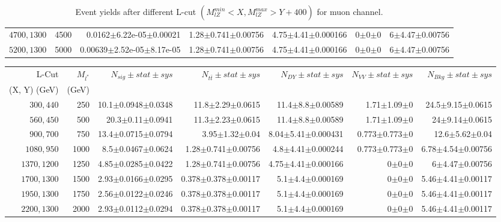 \documentclass[]{article}
\begin{document}
\begin{table}
\begin{center}
{\begin{tabular}{ |r|r|r|r|r|r|r|}
$4700,1300$ & 4500 & 0.0162$\pm$6.22e-05$\pm$0.00021 & 1.28$\pm$0.741$\pm$0.00756 & 4.75$\pm$4.41$\pm$0.000166 & 0$\pm$0$\pm$0 & 6$\pm$4.47$\pm$0.00756 \\
$5200,1300$ & 5000 & 0.00639$\pm$2.52e-05$\pm$8.17e-05 & 1.28$\pm$0.741$\pm$0.00756 & 4.75$\pm$4.41$\pm$0.000166 & 0$\pm$0$\pm$0 & 6$\pm$4.47$\pm$0.00756 \\
\hline 
\end{tabular}
}
\end{center}
\caption{Event yields after different L-cut $(M_{lZ}^{min} < X, M_{lZ}^{max} > Y + 400)$ for muon channel.}
\end{table}
\begin{table}
\begin{center}
\scriptsize{
\begin{tabular}{ |r|r|r|r|r|r|r|}
\hline 
L-Cut & $M_{l^*}$ & $N_{sig}\pm stat \pm sys $ &$N_{t\bar{t}}\pm stat \pm sys $ & $N_{DY}\pm stat \pm sys $ & $N_{VV}\pm stat \pm sys $ &$N_{Bkg}\pm stat \pm sys$\\
 (X, Y) (GeV) & (GeV) & && &&\\
\hline 
$300, 440$ & 250 & 10.1$\pm$0.0948$\pm$0.0348 & 11.8$\pm$2.29$\pm$0.0615 & 11.4$\pm$8.8$\pm$0.00589 & 1.71$\pm$1.09$\pm$0 & 24.5$\pm$9.15$\pm$0.0615 \\
$560, 450$ & 500 & 20.3$\pm$0.11$\pm$0.0941 & 11.3$\pm$2.23$\pm$0.0615 & 11.4$\pm$8.8$\pm$0.00589 & 1.71$\pm$1.09$\pm$0 & 24$\pm$9.14$\pm$0.0615 \\
$900, 700$ & 750 & 13.4$\pm$0.0715$\pm$0.0794 & 3.95$\pm$1.32$\pm$0.04 & 8.04$\pm$5.41$\pm$0.000431 & 0.773$\pm$0.773$\pm$0 & 12.6$\pm$5.62$\pm$0.04 \\
$1080,950$ & 1000 & 8.5$\pm$0.0467$\pm$0.0624 & 1.28$\pm$0.741$\pm$0.00756 & 4.8$\pm$4.41$\pm$0.000244 & 0.773$\pm$0.773$\pm$0 & 6.78$\pm$4.54$\pm$0.00756 \\
$1370,1200$ & 1250 & 4.85$\pm$0.0285$\pm$0.0422 & 1.28$\pm$0.741$\pm$0.00756 & 4.75$\pm$4.41$\pm$0.000166 & 0$\pm$0$\pm$0 & 6$\pm$4.47$\pm$0.00756 \\
$1700,1300$ & 1500 & 2.93$\pm$0.0166$\pm$0.0295 & 0.378$\pm$0.378$\pm$0.00117 & 5.1$\pm$4.4$\pm$0.000169 & 0$\pm$0$\pm$0 & 5.46$\pm$4.41$\pm$0.00117 \\
$1950,1300$ & 1750 & 2.56$\pm$0.0122$\pm$0.0246 & 0.378$\pm$0.378$\pm$0.00117 & 5.1$\pm$4.4$\pm$0.000169 & 0$\pm$0$\pm$0 & 5.46$\pm$4.41$\pm$0.00117 \\
$2200,1300$ & 2000 & 2.93$\pm$0.0112$\pm$0.0294 & 0.378$\pm$0.378$\pm$0.00117 & 5.1$\pm$4.4$\pm$0.000169 & 0$\pm$0$\pm$0 & 5.46$\pm$4.41$\pm$0.00117 \\

\end{tabular}}
\end{center}
\end{table}
\end{document}
